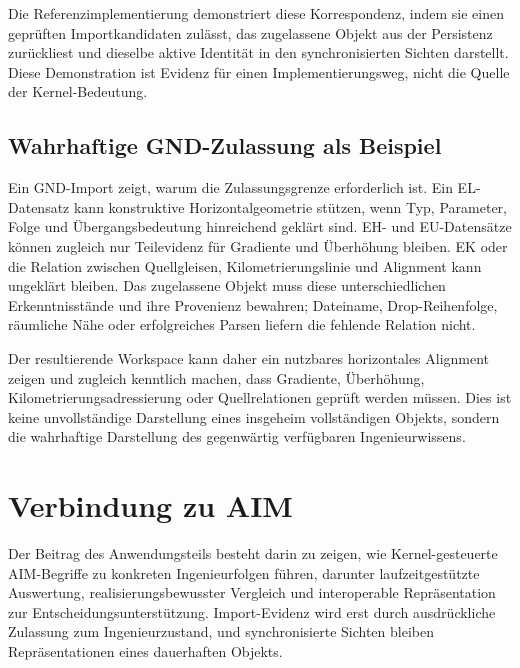 Die Referenzimplementierung demonstriert diese Korrespondenz, indem sie einen
geprüften Importkandidaten zulässt, das zugelassene Objekt aus der Persistenz
zurückliest und dieselbe aktive Identität in den synchronisierten Sichten
darstellt. Diese Demonstration ist Evidenz für einen Implementierungsweg, nicht
die Quelle der Kernel-Bedeutung.

\subsection{Wahrhaftige GND-Zulassung als Beispiel}

Ein GND-Import zeigt, warum die Zulassungsgrenze erforderlich ist. Ein
EL-Datensatz kann konstruktive Horizontalgeometrie stützen, wenn Typ,
Parameter, Folge und Übergangsbedeutung hinreichend geklärt sind. EH- und
EU-Datensätze können zugleich nur Teilevidenz für Gradiente und Überhöhung
bleiben. EK oder die Relation zwischen Quellgleisen, Kilometrierungslinie und
Alignment kann ungeklärt bleiben. Das zugelassene Objekt muss diese
unterschiedlichen Erkenntnisstände und ihre Provenienz bewahren; Dateiname,
Drop-Reihenfolge, räumliche Nähe oder erfolgreiches Parsen liefern die fehlende
Relation nicht.

Der resultierende Workspace kann daher ein nutzbares horizontales Alignment
zeigen und zugleich kenntlich machen, dass Gradiente, Überhöhung,
Kilometrierungsadressierung oder Quellrelationen geprüft werden müssen. Dies
ist keine unvollständige Darstellung eines insgeheim vollständigen Objekts,
sondern die wahrhaftige Darstellung des gegenwärtig verfügbaren
Ingenieurwissens.

\section{Verbindung zu AIM}
\begin{summary}
Der Beitrag des Anwendungsteils besteht darin zu zeigen, wie Kernel-gesteuerte
AIM-Begriffe zu konkreten Ingenieurfolgen führen, darunter
laufzeitgestützte Auswertung, realisierungsbewusster Vergleich und
interoperable Repräsentation zur Entscheidungsunterstützung. Import-Evidenz
wird erst durch ausdrückliche Zulassung zum Ingenieurzustand, und
synchronisierte Sichten bleiben Repräsentationen eines dauerhaften Objekts.
\end{summary}
